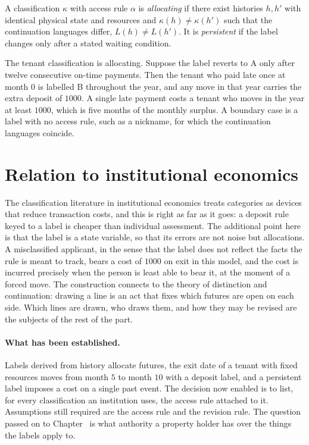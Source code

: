 \begin{definition}\label{def:allocating}
A classification $\kappa$ with access rule $\alpha$ is \emph{allocating} if there exist histories $h,h'$ with identical physical state and resources and $\kappa(h)\ne\kappa(h')$ such that the continuation languages differ, $L(h)\ne L(h')$. It is \emph{persistent} if the label changes only after a stated waiting condition.
\end{definition}

The tenant classification is allocating. Suppose the label reverts to A only after twelve consecutive on-time payments. Then the tenant who paid late once at month $0$ is labelled B throughout the year, and any move in that year carries the extra deposit of $1000$. A single late payment costs a tenant who moves in the year at least $1000$, which is five months of the monthly surplus. A boundary case is a label with no access rule, such as a nickname, for which the continuation languages coincide.

\section{Relation to institutional economics}

The classification literature in institutional economics treats categories as devices that reduce transaction costs, and this is right as far as it goes: a deposit rule keyed to a label is cheaper than individual assessment. The additional point here is that the label is a state variable, so that its errors are not noise but allocations. A misclassified applicant, in the sense that the label does not reflect the facts the rule is meant to track, bears a cost of $1000$ on exit in this model, and the cost is incurred precisely when the person is least able to bear it, at the moment of a forced move. The construction connects to the theory of distinction and continuation: drawing a line is an act that fixes which futures are open on each side. Which lines are drawn, who draws them, and how they may be revised are the subjects of the rest of the part.

\paragraph{What has been established.} Labels derived from history allocate futures, the exit date of a tenant with fixed resources moves from month $5$ to month $10$ with a deposit label, and a persistent label imposes a cost on a single past event. The decision now enabled is to list, for every classification an institution uses, the access rule attached to it. Assumptions still required are the access rule and the revision rule. The question passed on to Chapter~ is what authority a property holder has over the things the labels apply to.

